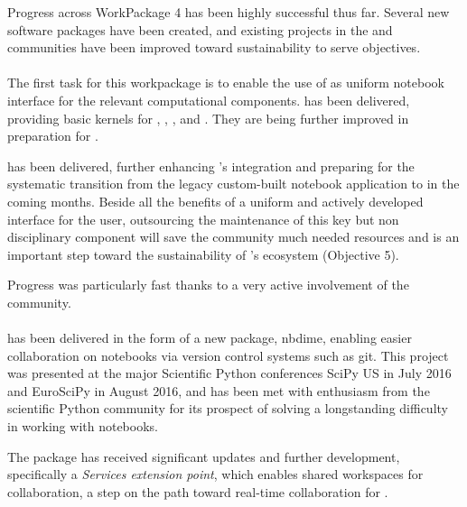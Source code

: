\documentclass{deliverablereport}
\begin{document}
Progress across WorkPackage 4 has been highly successful thus far.
Several new software packages have been created,
and existing projects in the \Sage and \Jupyter communities have been improved toward sustainability to serve \ODK objectives.

\paragraph{}
\label{UI@ipython-kernels}
The first task for this workpackage is to enable the use of \Jupyter
as uniform notebook interface for the relevant computational
components.  has been delivered,
providing basic \Jupyter kernels for \GAP, \Pari, \Sage, and
\Singular. They are being further improved in preparation for
.

 has been delivered, further
enhancing \Sage's \Jupyter integration and preparing for the
systematic transition from the legacy custom-built \Sage notebook
application to \Jupyter in the coming months. Beside all the benefits
of a uniform and actively developed interface for the user,
outsourcing the maintenance of this key but non disciplinary component
will save the \Sage community much needed resources and is an
important step toward the sustainability of \ODK's ecosystem
(Objective 5).

Progress was particularly fast thanks to a very active involvement of
the \Sage community.

\paragraph{}

 has been delivered in the form of a new \Jupyter package, nbdime,
enabling easier collaboration on notebooks via version control systems such as git. This project
was presented at the major Scientific Python conferences SciPy US in July 2016 and EuroSciPy in August 2016,
and has been met with enthusiasm from the scientific Python community for its prospect of solving a
longstanding difficulty in working with notebooks.

The \JupyterHub package has received significant updates and further development, specifically a
\emph{Services extension point}, which enables shared workspaces for collaboration, a step on the path
toward real-time collaboration for .
\end{document}
